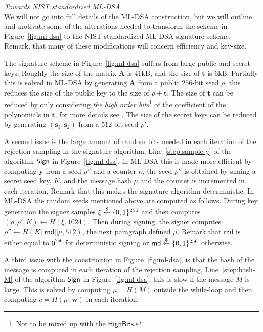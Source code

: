 

\bigskip \noindent \textit{Towards  NIST standardized ML-DSA} \\
We will not go into full details of the ML-DSA construction, but we will outline and motivate some of the alterations needed to transform the scheme in Figure~\ref{fig:ml-dsa} to the NIST standardized ML-DSA signature scheme. Remark, that many of these modifications will concern efficiency and key-size. 


The signature scheme in Figure~\ref{fig:ml-dsa} suffers from large public and secret keys. Roughly the size of the matrix \(\mathbf{A}\) is \(41\)kB, and the size of \(\mathbf{t}\) is \(6\)kB. Partially this is solved in ML-DSA by generating \(\mathbf{A}\) from a public $256$-bit seed \(\rho\), this reduces the size of the public key to the size of \(\rho + \mathbf{t}\). The size of \(\mathbf{t}\) can be reduced by only considering \textit{the high order bits}\footnote{Not to be mixed up with the \(\mathsf{HighBits}\).} of the coefficient of the polynomials in \(\mathbf{t}\), for more details see \cite{NISTPQC-R3:CRYSTALS-DILITHIUM20}. The size of the secret keys can be reduced by generating \((\mathbf{s}_1,\mathbf{s}_2)\) from a $512$-bit seed \(\rho'\).

A second issue is the large amount of random bits needed in each iteration of the rejection-sampling in the signature algorithm, Line~\ref{step:sample-y} of the algorithm \(\mathsf{Sign}\) in Figure~\ref{fig:ml-dsa}, in ML-DSA this is made more efficient by computing \(\mathbf{y}\) from a seed \(\rho''\) and a counter \(\kappa\), the seed \(\rho''\) is obtained by shaing a secret seed key, \(K\), and the message hash \(\mu\) and the counter is incremented in each iteration. Remark that this makes the signature algorithm deterministic. 
In ML-DSA the random seeds mentioned above are computed as follows. 
During key generation the signer samples \(\xi\overset{\$}{\leftarrow} \{0,1\}^{256}\) and then computes \((\rho,\rho',K)\gets H(\xi,1024)\). Then during signing, the signer computes \(\rho''\gets H(K||\mathsf{rnd}||\mu,512)\), the next paragraph defined \(\mu\). Remark that \(\mathsf{rnd}\) is either equal to \(0^{256}\) for deterministic signing or \(\mathsf{rnd}\overset{\$}{\leftarrow}\{0,1\}^{256}\) otherwise.

A third issue with the construction in Figure~\ref{fig:ml-dsa}, is that the hash of the message is computed in each iteration of the rejection sampling, Line~\ref{step:hash-M} of the algorithm \(\mathsf{Sign}\) in Figure~\ref{fig:ml-dsa}, this is slow if the message \(M\) is large. This is solved by computing \(\mu=H(M)\) outside the while-loop and then computing \(c=H(\mu||\mathbf{w})\) in each iteration.